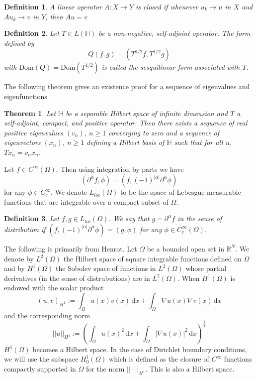 \documentclass[12pt]{report}
\newtheorem{theorem}{Theorem}[section]
\newtheorem{definition}{Definition}
\numberwithin{definition}{section}
\begin{document}
\begin{definition}
  A linear operator $ A : X \to Y $ is closed if whenever $u_{k} \to u$ in $X$ and $Au_{k} \to v$ in $Y$, then $Au = v$
\end{definition}


\begin{definition}
  Let $T \in L(\mathbb{H})$ be a non-negative, self-adjoint operator. The form defined by
  \[
  Q(f,g) = \left( T^{1 / 2}f,T^{1 / 2}g \right)
  \] 
  with $\text{Dom}(Q) = \text{Dom}(T^{1 / 2})$ is called the sesquilinear form associated with $T$.
\end{definition}

The following theorem gives an existence proof for a sequence of eigenvalues and eigenfunctions\cite{evans}

\begin{theorem} \label{spectrum}
  Let $\mathbb{H}$ be a separable Hilbert space of infinite dimension and $T$ a self-adjoint, compact, and positive operator. 
  Then there exists a sequence of real positive eigenvalues $(v_{n})$, $n \geq 1$ converging to zero and a sequence of eigenvectors $(x_{n})$, $n \geq 1$ defining a Hilbert basis of $\mathbb{H}$ such that for all $n$, $Tx_{n} = v_{n} x_{n}$.
\end{theorem}


Let $f \in C^{\infty}(\Omega)$.
Then using integration by parts we have 
\[
\left( \partial^{\alpha}f, \phi \right) = \left( f, (-1)^{| \alpha |} \partial^{\alpha} \phi \right)
\] 
for any $\phi \in C_{c}^{\infty}$.
We denote $L_{loc}(\Omega)$ to be the space of Lebesgue measurable functions that are integrable over a compact subset of $\Omega$.

\begin{definition}
 Let $f,g \in L_{loc}(\Omega)$. We say that $g = \partial^{\alpha} f$ in the sense of distribution if $\left( f, (-1)^{| \alpha |} \partial^{\alpha} \phi \right) = \left( g,\phi \right)$ for any $\phi \in C_{c}^{\infty}(\Omega)$.
\end{definition}

The following is primarily from Henrot\cite{henrot}.
Let $\Omega$ be a bounded open set in $\mathbb{R}^{N} $.
We denote by $L^{2}(\Omega)$ the Hilbert space of square integrable functions defined on $\Omega$ and by $H^{1}(\Omega)$ the Sobolev space of functions in $L^{2}(\Omega)$ whose partial derivatives (in the sense of distrubutions) are in $L^{2}(\Omega)$.
When $H^{1}(\Omega)$ is endowed with the scalar product
\[
  \left( u,v \right)_{H^{1}} := \int_{ \Omega} \! u(x)v(x) \, \mathrm{d}x + \int_{ \Omega} \! \nabla u(x) \nabla v(x) \, \mathrm{d}x 
\] 
and the corresponding norm 
\[
  || u ||_{H^{1}} := \left( \int_{ \Omega} \! u(x)^{2} \, \mathrm{d}x + \int_{ \Omega} \! | \nabla u(x) |^{2} \, \mathrm{d}x  \right)^{\frac{1}{2}}
\] 
$H^{1}(\Omega)$ becomes a Hilbert space.
In the case of Dirichlet boundary conditions, we will use the subspace $H_{0}^{1}(\Omega)$ which is defined as the closure of $C^{\infty}$ functions compactly supported in $\Omega$ for the norm $|| \cdot ||_{H^{1}}$.
This is also a Hilbert space.
\end{document}
